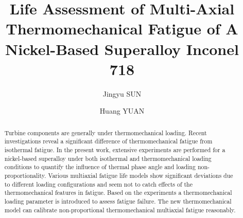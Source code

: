\documentclass[preprint,5p,twocolumn,11pt,sort&compress]{elsarticle}
\begin{document}



\begin{frontmatter}



\title{Life Assessment of Multi-Axial Thermomechanical Fatigue of A Nickel-Based Superalloy Inconel 718}


\author{Jingyu SUN}
\author{Huang YUAN}

\address[label1]{School of Aerospace Engineering, Tsinghua University, Beijing, China}
\address[label2]{Department of Civil Engineering, Technical University of Darmstadt, Germany}

\begin{abstract}

Turbine components are generally under thermomechanical loading. Recent investigations reveal a significant difference of thermomechanical fatigue from isothermal fatigue. In the present work, extensive experiments are performed for a nickel-based superalloy under both isothermal and thermomechanical loading conditions to quantify the influence of thermal phase angle and loading non-proportionality. Various multiaxial fatigue life models show significant deviations due to different loading configurations and seem not to catch effects of the thermomechanical features in fatigue. Based on the experiments a thermomechanical loading parameter is introduced to assess fatigue failure. The new thermomechanical model can calibrate non-proportional thermomechanical multiaxial fatigue reasonably.


\end{abstract}
\end{frontmatter}
\end{document}
